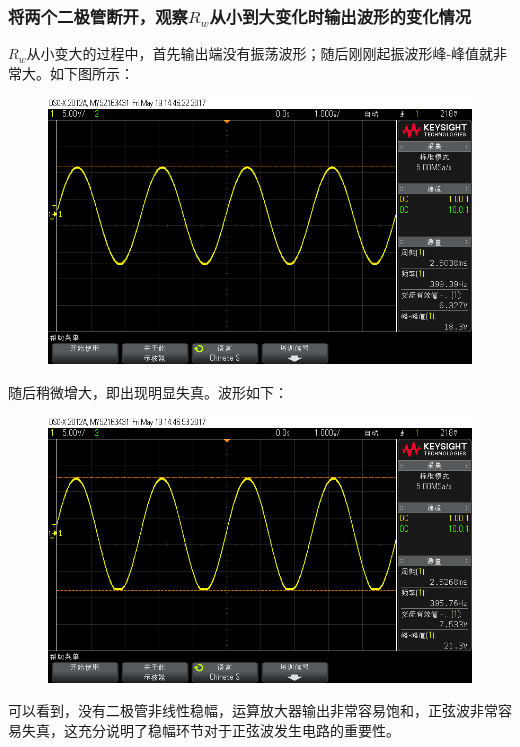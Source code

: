 \documentclass[12pt,a4paper]{article}
\begin{document}
\begin{spacing}{1.3}
\subsubsection{将两个二极管断开，观察$R_w$从小到大变化时输出波形的变化情况}
$R_w$从小变大的过程中，首先输出端没有振荡波形；随后刚刚起振波形峰-峰值就非常大。如下图所示：
\begin{figure}[H]
\centering
\includegraphics[width=\textwidth]{scope_3-1.png}
\end{figure}
随后稍微增大，即出现明显失真。波形如下：
\begin{figure}[H]
\centering
\includegraphics[width=\textwidth]{scope_3-2.png}
\end{figure}
可以看到，没有二极管非线性稳幅，运算放大器输出非常容易饱和，正弦波非常容易失真，这充分说明了稳幅环节对于正弦波发生电路的重要性。

\end{spacing}
\end{document}
